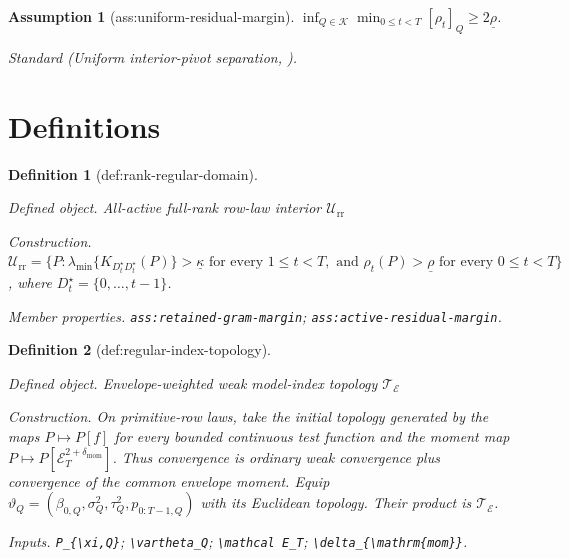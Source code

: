 \documentclass{article}
\newtheorem{assumption}{Assumption}
\newtheorem{definition}{Definition}
\begin{document}
\begin{assumption}[ass:uniform-residual-margin]\label{ass:uniform-residual-margin}
\(\inf_{Q\in\mathcal K}\min_{0\le t<T}[\rho_t]_Q\ge2\underline\rho\).
\par\smallskip\noindent\emph{Standard} (Uniform interior-pivot separation, \cite{NeweyMcFadden1994LargeSample}).
\end{assumption}

\section{Definitions}

\begin{definition}[def:rank-regular-domain]\label{def:rank-regular-domain}
\par\smallskip\noindent\emph{Defined object.} All-active full-rank row-law interior \(\mathcal U_{\mathrm{rr}}\)
\par\smallskip\noindent\emph{Construction.} \(\mathcal U_{\mathrm{rr}}=\{P:\lambda_{\min}\{K_{D_t^{\star}D_t^{\star}}(P)\}>\underline\kappa\text{ for every }1\le t<T,\text{ and }\rho_t(P)>\underline\rho\text{ for every }0\le t<T\}\), where \(D_t^{\star}=\{0,\ldots,t-1\}\).
\par\smallskip\noindent\emph{Member properties.} \texttt{ass:\allowbreak{}retained-\allowbreak{}gram-\allowbreak{}margin}; \texttt{ass:\allowbreak{}active-\allowbreak{}residual-\allowbreak{}margin}.
\end{definition}

\begin{definition}[def:regular-index-topology]\label{def:regular-index-topology}
\par\smallskip\noindent\emph{Defined object.} Envelope-weighted weak model-index topology \(\mathcal T_{\mathcal E}\)
\par\smallskip\noindent\emph{Construction.} On primitive-row laws, take the initial topology generated by the maps \(P\mapsto P[f]\) for every bounded continuous test function and the moment map \(P\mapsto P[\mathcal E_T^{2+\delta_{\mathrm{mom}}}]\). Thus convergence is ordinary weak convergence plus convergence of the common envelope moment. Equip \(\vartheta_Q=(\beta_{0,Q},\sigma_Q^2,\tau_Q^2,p_{0:T-1,Q})\) with its Euclidean topology. Their product is \(\mathcal T_{\mathcal E}\).
\par\smallskip\noindent\emph{Inputs.} \texttt{P\_\allowbreak{}\{\textbackslash{}\allowbreak{}xi,\allowbreak{}Q\}\allowbreak{}}; \texttt{\textbackslash{}\allowbreak{}vartheta\_\allowbreak{}Q}; \texttt{\textbackslash{}\allowbreak{}mathcal E\_\allowbreak{}T}; \texttt{\textbackslash{}\allowbreak{}delta\_\allowbreak{}\{\textbackslash{}\allowbreak{}mathrm\{mom\}\allowbreak{}\}\allowbreak{}}.
\end{definition}
\end{document}
